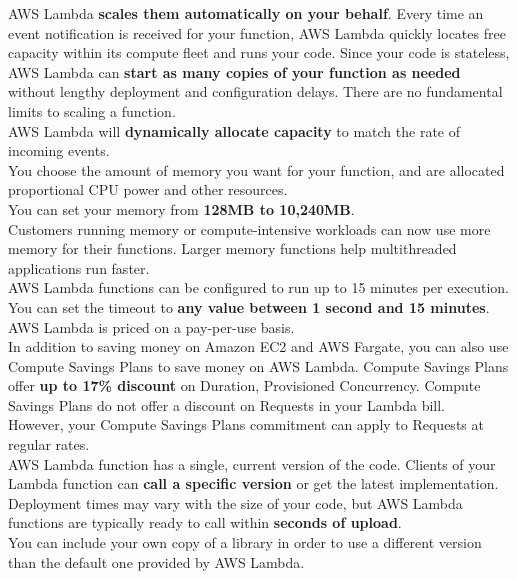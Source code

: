 \documentclass[12pt, letterpaper, twoside]{article}
\begin{document}
AWS Lambda \textbf{scales them automatically on your behalf}. Every time an event notification is received for your function, 
AWS Lambda quickly locates free capacity within its compute fleet and runs your code. Since your code is stateless, AWS Lambda 
can \textbf{start as many copies of your function as needed} without lengthy deployment and configuration delays. There are no 
fundamental limits to scaling a function.\\
AWS Lambda will \textbf{dynamically allocate capacity} to match the rate of incoming events.\\

You choose the amount of memory you want for your function, and are allocated proportional CPU power and other resources.\\
You can set your memory from \textbf{128MB to 10,240MB}.\\

Customers running memory or compute-intensive workloads can now use more memory for their functions. Larger memory functions 
help multithreaded applications run faster.\\

AWS Lambda functions can be configured to run up to 15 minutes per execution. You can set the timeout to \textbf{any value between 
1 second and 15 minutes}.\\

AWS Lambda is priced on a pay-per-use basis.\\

In addition to saving money on Amazon EC2 and AWS Fargate, you can also use Compute Savings Plans to save money on AWS Lambda. 
Compute Savings Plans offer \textbf{up to 17\% discount} on Duration, Provisioned Concurrency.
Compute Savings Plans do not offer a discount on Requests in your Lambda bill.\\
However, your Compute Savings Plans commitment can apply to Requests at regular rates.\\

AWS Lambda function has a single, current version of the code. Clients of your Lambda function can \textbf{call a specific version} or 
get the latest implementation.\\

Deployment times may vary with the size of your code, but AWS Lambda functions are typically ready to call within 
\textbf{seconds of upload}.\\

You can include your own copy of a library in order to use a different version than the default one provided by AWS Lambda.\\
\end{document}
